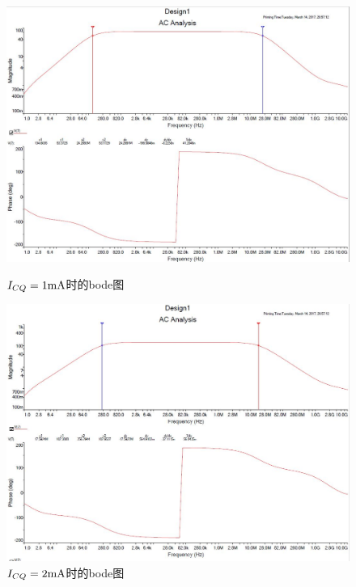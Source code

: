 \documentclass[UTF8,a4paper]{ctexart}
\begin{document}
\begin{figure}
\centering
\includegraphics[width=\textwidth]{b1.jpg}
\caption{$I_{CQ}=1\rm{mA}$时的bode图}
\label{bode1}
\includegraphics[width=\textwidth]{b2.jpg}
\caption{$I_{CQ}=2\rm{mA}$时的bode图}
\label{bode2}
\end{figure}
\end{document}
